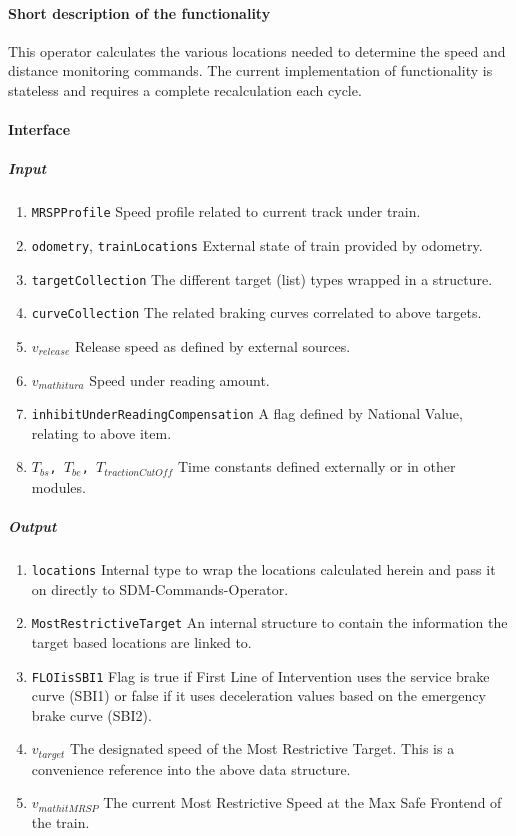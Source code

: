 \paragraph{Short description of the functionality}
This operator calculates the various locations needed to determine the speed and distance monitoring commands. The current implementation of functionality is stateless and requires a complete recalculation each cycle.

\paragraph{Interface}
\subparagraph{Input}
\begin{enumerate}
  \item \texttt{MRSPProfile} Speed profile related to current track under train.
  \item \texttt{odometry}, \texttt{trainLocations} External state of train provided by odometry.
  \item \texttt{targetCollection} The different target (list) types wrapped in a structure.
  \item \texttt{curveCollection} The related braking curves correlated to above targets.
  \item \texttt{$v_{\mathit{release}}$} Release speed as defined by external sources.
  \item \texttt{$v_{mathit{ura}}$} Speed under reading amount.
  \item \texttt{inhibitUnderReadingCompensation} A flag defined by National Value, relating to above item.
  \item \texttt{$T_{bs}$, $T_{be}$, $T_{\mathit{tractionCutOff}}$} Time constants defined externally or in other modules.
\end{enumerate}
\subparagraph{Output}
\begin{enumerate}
  \item \texttt{locations} Internal type to wrap the locations calculated herein and pass it on directly to SDM-Commands-Operator.
  \item \texttt{MostRestrictiveTarget} An internal structure to contain the information the target based locations are linked to.
  \item \texttt{FLOIisSBI1} Flag is true if First Line of Intervention uses the service brake curve (SBI1) or false if it uses deceleration values based on the emergency brake curve (SBI2).
  \item \texttt{$v_{\mathit{target}}$} The designated speed of the Most Restrictive Target. This is a convenience reference into the above data structure. 
  \item \texttt{$v_{mathit{MRSP}}$} The current Most Restrictive Speed at the Max Safe Frontend of the train.
\end{enumerate}

